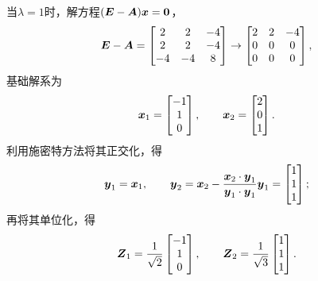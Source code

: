 \begin{example}
\begin{solution}
当\(\lambda=1\)时，解方程\((\boldsymbol{E}-\boldsymbol{A})\boldsymbol{x}=\boldsymbol0\)，\begin{equation*}
	\boldsymbol{E}-\boldsymbol{A} = \begin{bmatrix}
		2 & 2 & -4 \\
		2 & 2 & -4 \\
		-4 & -4 & 8
	\end{bmatrix}
	\to \begin{bmatrix}
		2 & 2 & -4 \\
		0 & 0 & 0 \\
		0 & 0 & 0
	\end{bmatrix},
\end{equation*}基础解系为\begin{equation*}
	\boldsymbol{x}_1 = \begin{bmatrix} -1 \\ 1 \\ 0 \end{bmatrix},
	\qquad
	\boldsymbol{x}_2 = \begin{bmatrix} 2 \\ 0 \\ 1 \end{bmatrix}.
\end{equation*}
利用施密特方法将其正交化，得\begin{equation*}
	\boldsymbol{y}_1=\boldsymbol{x}_1,
	\qquad
	\boldsymbol{y}_2=\boldsymbol{x}_2-\frac{\boldsymbol{x}_2\cdot\boldsymbol{y}_1}{\boldsymbol{y}_1\cdot\boldsymbol{y}_1}\boldsymbol{y}_1
	=\begin{bmatrix} 1 \\ 1 \\ 1 \end{bmatrix};
\end{equation*}再将其单位化，得\begin{equation*}
	\boldsymbol{Z}_1
	= \frac{1}{\sqrt{2}} \begin{bmatrix} -1 \\ 1 \\ 0 \end{bmatrix},
	\qquad
	\boldsymbol{Z}_2
	= \frac{1}{\sqrt{3}} \begin{bmatrix} 1 \\ 1 \\ 1 \end{bmatrix}.
\end{equation*}


\end{solution}
\end{example}
